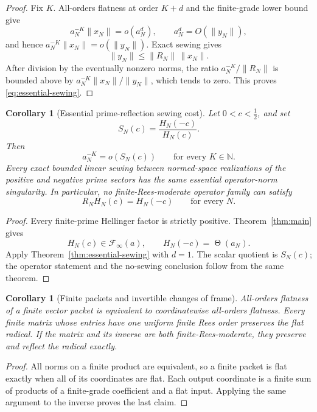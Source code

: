 \documentclass[11pt]{article}
\newtheorem{corollary}[theorem]{Corollary}
\theoremstyle{definition}
\theoremstyle{remark}
\newcommand{\N}{\mathbb N}
\newcommand{\cF}{\mathcal F}
\newcommand{\Thetaas}{\mathop{\Theta}}
\begin{document}
\begin{proof}
Fix \(K\).  All-orders flatness at order \(K+d\) and the finite-grade lower bound give
\[
 a_N^{-K}\|x_N\|=o(a_N^d),
 \qquad
 a_N^d=O(\|y_N\|),
\]
and hence \(a_N^{-K}\|x_N\|=o(\|y_N\|)\).
Exact sewing gives
\[
 \|y_N\|\leq\|R_N\|\,\|x_N\|.
\]
After division by the eventually nonzero norms, the ratio
\(a_N^{-K}/\|R_N\|\) is bounded above by
\(a_N^{-K}\|x_N\|/\|y_N\|\), which tends to zero.  This proves
\eqref{eq:essential-sewing}.
\end{proof}

\begin{corollary}[Essential prime-reflection sewing cost]\label{cor:no-sewing}
Let \(0<c<\tfrac12\), and set
\[
 S_N(c)=\frac{H_N(-c)}{H_N(c)}.
\]
Then
\[
 a_N^{-K}=o\!\left(S_N(c)\right)
 \qquad\text{for every }K\in\N.
 \tag{4.5}\label{eq:prime-essential-sewing}
\]
Every exact bounded linear sewing between normed-space realizations of the positive and negative
prime sectors has the same essential operator-norm singularity.  In particular, no
finite-Rees-moderate operator family can satisfy
\[
 R_NH_N(c)=H_N(-c)
 \qquad\text{for every }N.
 \tag{4.6}\label{eq:scalar-no-sewing}
\]
\end{corollary}

\begin{proof}
Every finite-prime Hellinger factor is strictly positive.
Theorem~\ref{thm:main} gives
\[
 H_N(c)\in\cF_\infty(a),\qquad H_N(-c)=\Thetaas(a_N).
\]
Apply Theorem~\ref{thm:essential-sewing} with \(d=1\).  The scalar quotient is \(S_N(c)\);
the operator statement and the no-sewing conclusion follow from the same theorem.
\end{proof}

\begin{corollary}[Finite packets and invertible changes of frame]\label{cor:finite-packets}
All-orders flatness of a finite vector packet is equivalent to coordinatewise all-orders
flatness.  Every finite matrix whose entries have one uniform finite Rees order preserves the
flat radical.  If the matrix and its inverse are both finite-Rees-moderate, they preserve and
reflect the radical exactly.
\end{corollary}

\begin{proof}
All norms on a finite product are equivalent, so a finite packet is flat exactly when all of its
coordinates are flat.  Each output coordinate is a finite sum of products of a finite-grade
coefficient and a flat input.  Applying the same argument to the inverse proves the last claim.
\end{proof}
\end{document}
